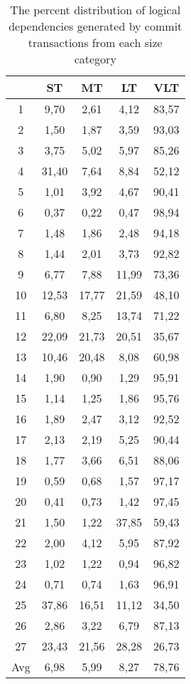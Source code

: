 \documentclass[a4paper,twoside]{article}
\begin{document}
\begin{table}[!h]
\renewcommand{\arraystretch}{1}
\caption{The percent distribution of logical dependencies generated by commit transactions from each size category}
\label{table:6}
\centering
\begin{tabular}{|c|c|c|c|c|}
\hline
   &	ST	&	MT	&	LT	&	VLT	\\
\hline
1	&	9,70	&	2,61	&	4,12	&	83,57	\\
2	&	1,50	&	1,87	&	3,59	&	93,03	\\
3	&	3,75	&	5,02	&	5,97	&	85,26	\\
4	&	31,40	&	7,64	&	8,84	&	52,12	\\
5	&	1,01	&	3,92	&	4,67	&	90,41	\\
6	&	0,37	&	0,22	&	0,47	&	98,94	\\
7	&	1,48	&	1,86	&	2,48	&	94,18	\\
8	&	1,44	&	2,01	&	3,73	&	92,82	\\
9	&	6,77	&	7,88	&	11,99	&	73,36	\\
10	&	12,53	&	17,77	&	21,59	&	48,10	\\
11	&	6,80	&	8,25	&	13,74	&	71,22	\\
12	&	22,09	&	21,73	&	20,51	&	35,67	\\
13	&	10,46	&	20,48	&	8,08	&	60,98	\\
14	&	1,90	&	0,90	&	1,29	&	95,91	\\
15	&	1,14	&	1,25	&	1,86	&	95,76	\\
16	&	1,89	&	2,47	&	3,12	&	92,52	\\
17	&	2,13	&	2,19	&	5,25	&	90,44	\\
18	&	1,77	&	3,66	&	6,51	&	88,06	\\
19	&	0,59	&	0,68	&	1,57	&	97,17	\\
20	&	0,41	&	0,73	&	1,42	&	97,45	\\
21	&	1,50	&	1,22	&	37,85	&	59,43	\\
22	&	2,00	&	4,12	&	5,95	&	87,92	\\
23	&	1,02	&	1,22	&	0,94	&	96,82	\\
24	&	0,71	&	0,74	&	1,63	&	96,91	\\
25	&	37,86	&	16,51	&	11,12	&	34,50	\\
26	&	2,86	&	3,22	&	6,79	&	87,13	\\
27	&	23,43	&	21,56	&	28,28	&	26,73	\\
\hline
Avg	&	6,98	&	5,99	&	8,27	&	78,76	\\
\hline
\end{tabular}
\end{table}
\end{document}
